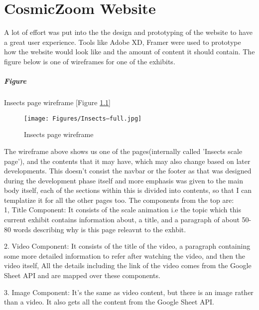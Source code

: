 
\chapter{CosmicZoom Website} %
\label{AppendixA} %

A lot of effort was put into the the design and prototyping of the website to have a great user experience. Tools like Adobe XD, Framer were used to prototype how the website would look like and the amount of content it should contain. The figure below is one of wireframes for one of the exhibits.

\paragraph*{Figure} Insects page wireframe [Figure \ref{fig:rb}]
\begin{figure}[h]
	\begin{center}
		\texttt{[image: Figures/Insects–full.jpg]}
		\caption{Insects page wireframe}
		\label{fig:rb}
	\end{center}
\end{figure}

The wireframe above shows us one of the pages(internally called 'Insects scale page'), and the contents that it may have, which may also change based on later developments. This doesn't consist the navbar or the footer as that was designed during the development phase itself and more emphasis was given to the main body itself, each of the sections within this is divided into contents, so that I can templatize it for all the other pages too. The components from the top are:
\\
1, Title Component: It consists of the scale animation i.e the topic which this current exhibit contains information about, a title, and a paragraph of about 50-80 words describing why is this page releavnt to the exhbit.

2. Video Component: It consists of the title of the video, a paragraph containing some more detailed information to refer after watching the video, and then the video itself, All the details including the link of the video comes from the Google Sheet API and are mapped over these components.

3. Image Component: It's the same as video content, but there is an image rather than a video. It also gets all the content from the Google Sheet API.

